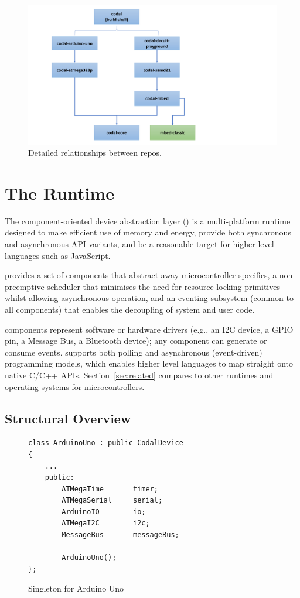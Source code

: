 \begin{figure}[t]
    \includegraphics[width=4.5in]{codalFig.pdf}
    \caption{\label{fig:codal}Detailed relationships between \CO repos.}
\end{figure}

\section{The \CO Runtime}
\label{sec:codal}

The component-oriented device abstraction layer (\CO) is a multi-platform runtime designed to make efficient use of memory and energy, provide both synchronous and asynchronous API variants, and be a reasonable target for higher level languages such as JavaScript.

\CO provides a set of components that abstract away microcontroller specifics, a non-preemptive scheduler that minimises the need for resource locking primitives whilst allowing asynchronous operation, and an eventing subsystem (common to all components) that enables the decoupling of system and user code.

\CO components represent software or hardware drivers (e.g., an I2C device, a GPIO pin, a Message Bus, a Bluetooth device); any component can generate or consume events. \CO supports both polling and asynchronous (event-driven) programming models, which enables higher level languages to map straight onto native C/C++ APIs. Section~\ref{sec:related} compares \CO to other runtimes and operating systems for microcontrollers.


\subsection{Structural Overview}

\begin{figure}
\begin{lstlisting}
class ArduinoUno : public CodalDevice
{
    ...
    public:
        ATMegaTime       timer;
        ATMegaSerial     serial;
        ArduinoIO        io;
        ATMegaI2C        i2c;
        MessageBus       messageBus;

        ArduinoUno();
};
\end{lstlisting}
\caption{\label{fig:codalSingleton}Singleton for Arduino Uno}
\end{figure}

